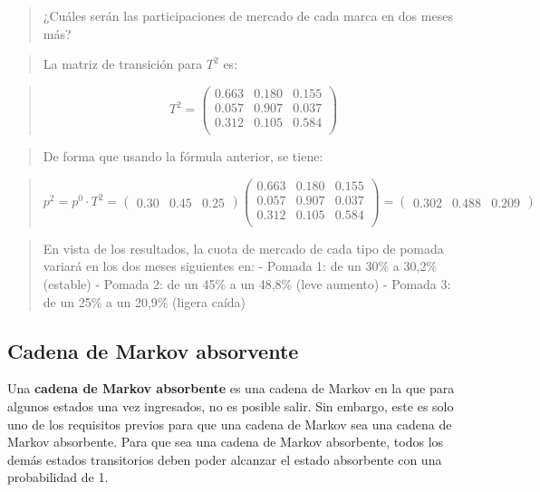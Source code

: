 \documentclass[
  a4paper,
  DIV=11,
  numbers=noendperiod]{scrreprt}
\begin{document}
\begin{quote}
¿Cuáles serán las participaciones de mercado de cada marca en dos meses
más?
\end{quote}

\begin{quote}
La matriz de transición para \(T^2\) es:
\end{quote}

\begin{quote}
\[
T^2 = \begin{pmatrix}
0.663 & 0.180 & 0.155 \\
0.057 & 0.907 & 0.037 \\
0.312 & 0.105 & 0.584 \\
\end{pmatrix}
\]
\end{quote}

\begin{quote}
De forma que usando la fórmula anterior, se tiene:
\end{quote}

\begin{quote}
\[
p^2 = p^0 \cdot T^2 = \begin{pmatrix}
0.30 & 0.45 & 0.25
\end{pmatrix} \begin{pmatrix}
0.663 & 0.180 & 0.155 \\
0.057 & 0.907 & 0.037 \\
0.312 & 0.105 & 0.584 \\
\end{pmatrix} = \begin{pmatrix}
0.302 & 0.488 & 0.209
\end{pmatrix}
\]
\end{quote}

\begin{quote}
En vista de los resultados, la cuota de mercado de cada tipo de pomada
variará en los dos meses siguientes en: - Pomada 1: de un 30\% a 30,2\%
(estable) - Pomada 2: de un 45\% a un 48,8\% (leve aumento) - Pomada 3:
de un 25\% a un 20,9\% (ligera caída)
\end{quote}

\subsection{Cadena de Markov
absorvente}\label{cadena-de-markov-absorvente}

Una \textbf{cadena de Markov absorbente} es una cadena de Markov en la
que para algunos estados una vez ingresados, no es posible salir. Sin
embargo, este es solo uno de los requisitos previos para que una cadena
de Markov sea una cadena de Markov absorbente. Para que sea una cadena
de Markov absorbente, todos los demás estados transitorios deben poder
alcanzar el estado absorbente con una probabilidad de 1.
\end{document}
